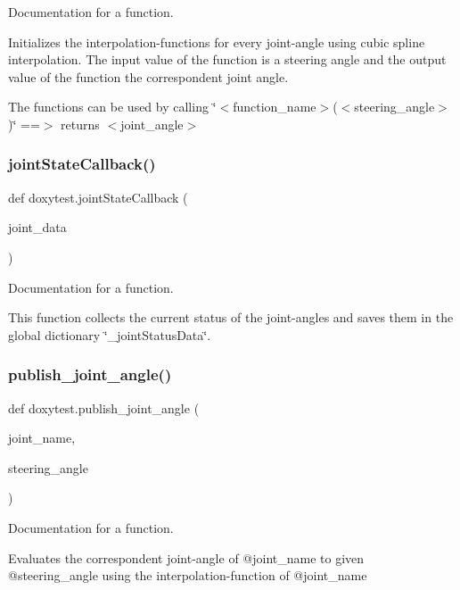 Documentation for a function. 

Initializes the interpolation-\/functions for every joint-\/angle using cubic spline interpolation. The input value of the function is a steering angle and the output value of the function the correspondent joint angle.

The functions can be used by calling \char`\"{}$<$function\+\_\+name$>$($<$steering\+\_\+angle$>$)\char`\"{} ==$>$ returns $<$joint\+\_\+angle$>$ \mbox{\label{namespacedoxytest_a8b6bffa231b5da916bd22d3565fefb51}} 
\subsubsection{\texorpdfstring{jointStateCallback()}{jointStateCallback()}}
{\footnotesize\ttfamily def doxytest.\+joint\+State\+Callback (\begin{DoxyParamCaption}\item[{}]{joint\+\_\+data }\end{DoxyParamCaption})}



Documentation for a function. 

This function collects the current status of the joint-\/angles and saves them in the global dictionary \char`\"{}\+\_\+joint\+Status\+Data\char`\"{}. \mbox{\label{namespacedoxytest_a001f8664bb3ab1e406bb1db4f367d1fe}} 
\subsubsection{\texorpdfstring{publish\_joint\_angle()}{publish\_joint\_angle()}}
{\footnotesize\ttfamily def doxytest.\+publish\+\_\+joint\+\_\+angle (\begin{DoxyParamCaption}\item[{}]{joint\+\_\+name,  }\item[{}]{steering\+\_\+angle }\end{DoxyParamCaption})}



Documentation for a function. 

Evaluates the correspondent joint-\/angle of @joint\+\_\+name to given @steering\+\_\+angle using the interpolation-\/function of @joint\+\_\+name

